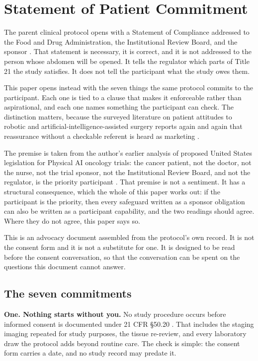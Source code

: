 \section{Statement of Patient Commitment}

The parent clinical protocol opens with a Statement of Compliance addressed to
the Food and Drug Administration, the Institutional Review Board, and the
sponsor \cite{onpremwhippl}. That statement is necessary, it is correct, and it
is not addressed to the person whose abdomen will be opened. It tells the
regulator which parts of Title 21 the study satisfies. It does not tell the
participant what the study owes them.

This paper opens instead with the seven things the same protocol commits to the
participant. Each one is tied to a clause that makes it enforceable rather than
aspirational, and each one names something the participant can check. The
distinction matters, because the surveyed literature on patient attitudes to
robotic and artificial-intelligence-assisted surgery reports again and again
that reassurance without a checkable referent is heard as marketing
\cite{Jauniaux2025, BrarRAS2024X}.

The premise is taken from the author's earlier analysis of proposed United
States legislation for Physical AI oncology trials: the cancer patient, not the
doctor, not the nurse, not the trial sponsor, not the Institutional Review
Board, and not the regulator, is the priority participant
\cite{paibillprior, hr9510billv5}. That premise is not a sentiment. It has a
structural consequence, which the whole of this paper works out: if the
participant is the priority, then every safeguard written as a sponsor
obligation can also be written as a participant capability, and the two
readings should agree. Where they do not agree, this paper says so.

This is an advocacy document assembled from the protocol's own record. It is not
the consent form and it is not a substitute for one. It is designed to be read
before the consent conversation, so that the conversation can be spent on the
questions this document cannot answer.

\subsection{The seven commitments}

\textbf{One. Nothing starts without you.} No study procedure occurs before
informed consent is documented under 21 CFR \S 50.20 \cite{ecfr2026part50}.
That includes the staging imaging repeated for study purposes, the tissue
re-review, and every laboratory draw the protocol adds beyond routine care. The
check is simple: the consent form carries a date, and no study record may
predate it.

